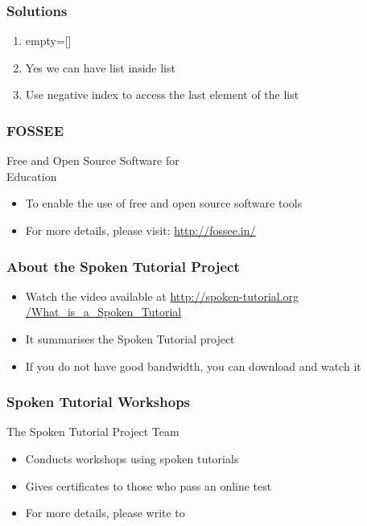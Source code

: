 \documentclass[17pt]{beamer}
\begin{document}
\begin{frame}[fragile]
	\frametitle{Solutions}
	\begin{enumerate}
        \item empty=[]
        \vspace{8pt}
        \item Yes we can have list inside list\\
        \vspace{8pt}
        \item Use negative index to access the last element of the list
    \end{enumerate}
\end{frame}
\begin{frame}
\frametitle{FOSSEE}
{\color{NavyBlue}Free and Open Source Software for \\Education} \\
\begin{itemize}
\item To enable the use of free and open source software tools
\item For more details, please visit: {\color{blue}\url{http://fossee.in/}}
\end{itemize}
\end{frame}
\begin{frame}
\frametitle{About the Spoken Tutorial Project}
\begin{itemize}
\item Watch the video available at {\color{blue}\url{http://spoken-tutorial.org /What\_is\_a\_Spoken\_Tutorial}} 
\item It summarises the Spoken Tutorial project 
\item If you do not have good bandwidth, you can download and watch it
\end{itemize}
\end{frame}
\begin{frame}
\frametitle{Spoken Tutorial Workshops}The Spoken Tutorial Project Team 
\begin{itemize}
\item Conducts workshops using spoken tutorials 
\item Gives certificates to those who pass an online test 
\item For more details, please write to \\ 
\end{itemize}
\end{frame}
\end{document}
